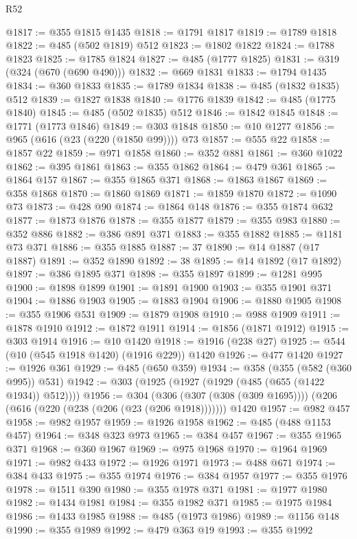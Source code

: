\begin{lexlean}{R52}
\begin{coremodule}
@1817 := @355 @1815 @1435
@1818 := @1791 @1817
@1819 := @1789 @1818
@1822 := @485 (@502 @1819) @512
@1823 := @1802 @1822
@1824 := @1788 @1823
@1825 := @1785 @1824
@1827 := @485 (@1777 @1825)
@1831 := @319 (@324 (@670 (@690 @490)))
@1832 := @669 @1831
@1833 := @1794 @1435
@1834 := @360 @1833
@1835 := @1789 @1834
@1838 := @485 (@1832 @1835) @512
@1839 := @1827 @1838
@1840 := @1776 @1839
@1842 := @485 (@1775 @1840)
@1845 := @485 (@502 @1835) @512
@1846 := @1842 @1845
@1848 := @1771 (@1773 @1846)
@1849 := @303 @1848
@1850 := @10 @1277
@1856 := @965 (@616 (@23 (@220 (@1850 @99)))) @73
@1857 := @555 @22
@1858 := @1857 @22
@1859 := @971 @1858
@1860 := @352 @881
@1861 := @360 @1022
@1862 := @395 @1861
@1863 := @355 @1862
@1864 := @479 @361
@1865 := @1864 @157
@1867 := @355 @1865 @371
@1868 := @1863 @1867
@1869 := @358 @1868
@1870 := @1860 @1869
@1871 := @1859 @1870
@1872 := @1090 @73
@1873 := @428 @90
@1874 := @1864 @148
@1876 := @355 @1874 @632
@1877 := @1873 @1876
@1878 := @355 @1877
@1879 := @355 @983
@1880 := @352 @886
@1882 := @386 @891 @371
@1883 := @355 @1882
@1885 := @1181 @73 @371
@1886 := @355 @1885
@1887 := 37
@1890 := @14 @1887 (@17 @1887)
@1891 := @352 @1890
@1892 := 38
@1895 := @14 @1892 (@17 @1892)
@1897 := @386 @1895 @371
@1898 := @355 @1897
@1899 := @1281 @995
@1900 := @1898 @1899
@1901 := @1891 @1900
@1903 := @355 @1901 @371
@1904 := @1886 @1903
@1905 := @1883 @1904
@1906 := @1880 @1905
@1908 := @355 @1906 @531
@1909 := @1879 @1908
@1910 := @988 @1909
@1911 := @1878 @1910
@1912 := @1872 @1911
@1914 := @1856 (@1871 @1912)
@1915 := @303 @1914
@1916 := @10 @1420
@1918 := @1916 (@238 @27)
@1925 := @544 (@10 (@545 @1918 @1420) (@1916 @229)) @1420
@1926 := @477 @1420
@1927 := @1926 @361
@1929 := @485 (@650 @359)
@1934 := @358 (@355 (@582 (@360 @995)) @531)
@1942 := @303 (@1925 (@1927 (@1929 (@485 (@655 (@1422 @1934)) @512))))
@1956 := @304
    (@306 (@307 (@308 (@309 @1695))))
    (@206 (@616 (@220 (@238 (@206 (@23 (@206 @1918)))))))
    @1420
@1957 := @982 @457
@1958 := @982 @1957
@1959 := @1926 @1958
@1962 := @485 (@488 @1153 @457)
@1964 := @348 @323 @973
@1965 := @384 @457
@1967 := @355 @1965 @371
@1968 := @360 @1967
@1969 := @975 @1968
@1970 := @1964 @1969
@1971 := @982 @433
@1972 := @1926 @1971
@1973 := @488 @671
@1974 := @384 @433
@1975 := @355 @1974
@1976 := @384 @1957
@1977 := @355 @1976
@1978 := @1511 @390
@1980 := @355 @1978 @371
@1981 := @1977 @1980
@1982 := @1434 @1981
@1984 := @355 @1982 @371
@1985 := @1975 @1984
@1986 := @1433 @1985
@1988 := @485 (@1973 @1986)
@1989 := @1156 @148
@1990 := @355 @1989
@1992 := @479 @363 @19
@1993 := @355 @1992

\end{coremodule}
\end{lexlean}
